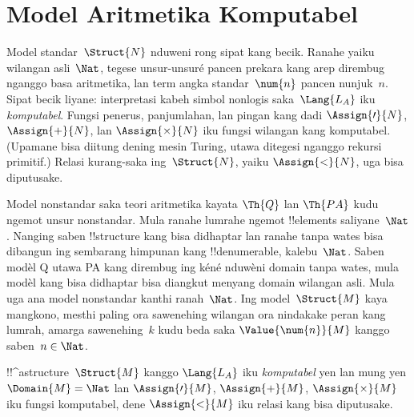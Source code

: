 \documentclass[../../../include/open-logic-section]{subfiles}
\begin{document}
\section{Model Aritmetika Komputabel}

\begin{explain}
Model standar~$\Struct{N}$
nduweni rong sipat kang becik.
Ranahe yaiku wilangan asli~$\Nat$,
tegese unsur-unsuré pancen
prekara kang arep dirembug
nganggo basa aritmetika,
lan term angka standar~$\num{n}$
pancen nunjuk~$n$.
Sipat becik liyane:
interpretasi kabeh simbol
nonlogis saka~$\Lang{L_A}$
iku \emph{komputabel}.
Fungsi penerus, panjumlahan,
lan pingan kang dadi
$\Assign{\prime}{N}$,
$\Assign{+}{N}$,
lan $\Assign{\times}{N}$
iku fungsi wilangan
kang komputabel.
(Upamane bisa diitung
dening mesin Turing,
utawa ditegesi nganggo
rekursi primitif.)
Relasi kurang-saka
ing~$\Struct{N}$,
yaiku $\Assign{<}{N}$,
uga bisa diputusake.

Model nonstandar saka
teori aritmetika kayata
$\Th{Q}$ lan
$\Th{PA}$ kudu
ngemot unsur nonstandar.
Mula ranahe lumrahe
ngemot !!{element}s
saliyane~$\Nat$.
Nanging saben
!!{structure} kang
bisa didhaptar lan ranahe tanpa wates
bisa dibangun ing
sembarang himpunan kang
!!{denumerable},
kalebu~$\Nat$. Saben modèl Q utawa PA kang dirembug ing kéné nduwèni domain tanpa wates, mula modèl kang bisa didhaptar bisa diangkut menyang domain wilangan asli.
Mula uga ana model
nonstandar kanthi
ranah~$\Nat$.
Ing model~$\Struct{M}$
kaya mangkono,
mesthi paling ora
sawenehing wilangan
ora nindakake peran
kang lumrah,
amarga sawenehing~$k$
kudu beda saka
$\Value{\num{n}}{M}$
kanggo saben~$n \in \Nat$.
\end{explain}

\begin{defn}
!!^a{structure}~$\Struct{M}$
kanggo $\Lang{L_A}$
iku \emph{komputabel}
yen lan mung yen
$\Domain{M} = \Nat$
lan $\Assign{\prime}{M}$,
$\Assign{+}{M}$,
$\Assign{\times}{M}$
iku fungsi komputabel,
dene $\Assign{<}{M}$
iku relasi kang
bisa diputusake.
\end{defn}
\end{document}
